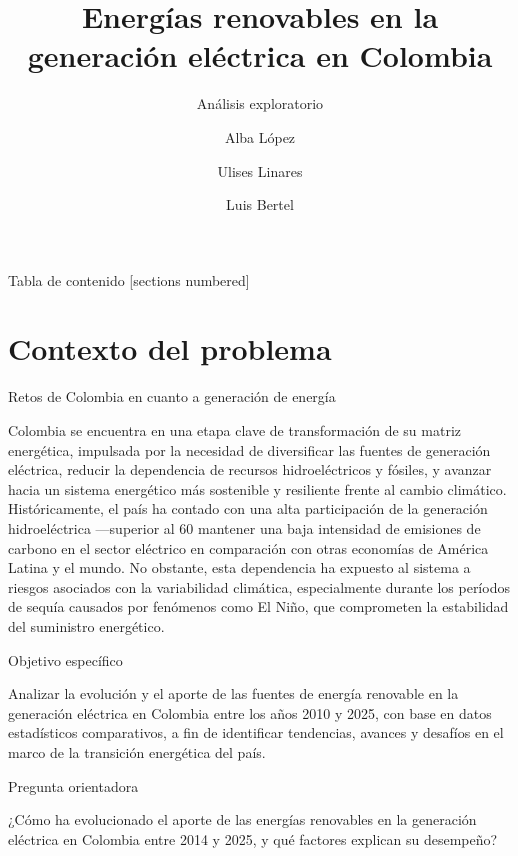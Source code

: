 \documentclass[10pt]{beamer}
\title{Energ\'ias renovables en la generaci\'on el\'ectrica en Colombia}
\subtitle{An\'alisis exploratorio}
\date{}
\author{Alba L\'opez \and Ulises Linares \and Luis Bertel}
\institute{Inteligencia Artificial - Nivel Exploratorio}
\begin{document}
	
	\maketitle
	
	\begin{frame}{Tabla de contenido}
		[sections numbered]
		\tableofcontents%
	\end{frame}
	
	\section[Contexto del problema]{Contexto del problema}
	
	\begin{frame}[fragile]{Retos de Colombia en cuanto a generaci\'on de energ\'ia}
		
Colombia se encuentra en una etapa clave de transformación de su matriz energética, impulsada por la necesidad de
diversificar las fuentes de generación eléctrica, reducir la dependencia de recursos hidroeléctricos y fósiles, y avanzar hacia un sistema energético más sostenible y resiliente frente al cambio climático. Históricamente, el país ha contado
con una alta participación de la generación hidroeléctrica —superior al 60 %
mantener una baja intensidad de emisiones de carbono en el sector eléctrico en comparación con otras economías
de América Latina y el mundo. No obstante, esta dependencia ha expuesto al sistema a riesgos asociados con la
variabilidad climática, especialmente durante los períodos de sequía causados por fenómenos como El Niño, que
comprometen la estabilidad del suministro energético.

	\end{frame}
	
	\begin{frame}[fragile]{Objetivo espec\'ifico}
		
Analizar la evolución y el aporte de las fuentes de energía renovable en la generación eléctrica en Colombia entre los
años 2010 y 2025, con base en datos estadísticos comparativos, a fin de identificar tendencias, avances y desafíos en
el marco de la transición energética del país.
		
	\end{frame}
	
	\begin{frame}[fragile]{Pregunta orientadora}
		
¿Cómo ha evolucionado el aporte de las energías renovables en la generación eléctrica en Colombia entre 2014 y 2025,
y qué factores explican su desempeño?
		
	\end{frame}
	
\end{document}
